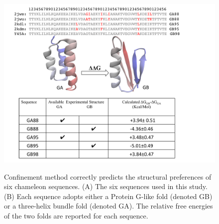 \documentclass[12pt]{article}
\begin{document}
\begin{figure}
\includegraphics[width=3.5 in,height=4 in]{orban.pdf}
\label{fig:orban}
\caption{Confinement method correctly predicts the structural preferences of six chameleon
sequences. (A) The six sequences used in this study. (B) Each sequence adopts either a Protein
G-like fold (denoted GB) or a three-helix bundle fold (denoted GA). The relative free energies of
the two folds are reported for each sequence.}
\end{figure}
\end{document}
